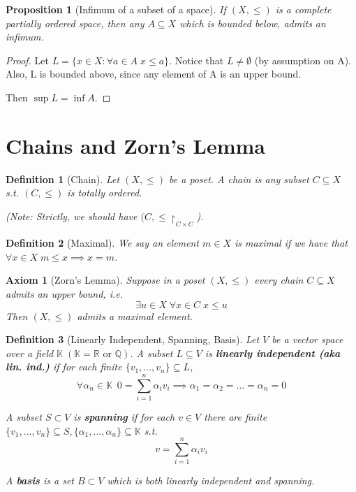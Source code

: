 \documentclass[11pt, oneside]{book}
\theoremstyle{break}
\newtheorem*{proof}{Proof}
\newtheorem{propo}{Proposition}[section]
\newtheorem{defn}{Definition}[section]
\newtheorem{axiom}{Axiom}[section]
\newcommand{\bb}[1]{\mathbb{#1}}			%
\begin{document}
\begin{propo}[Infimum of a subset of a space]
	If $(X, \leq)$ is a complete partially ordered space, then any $A \subseteq X$ which is bounded below, admits an infimum.
\end{propo}

\begin{proof}
	Let $L = \{x \in X : \forall a \in A \; x \leq a \}$. Notice that $L \neq \emptyset$ (by assumption on A). Also, L is bounded above, since any element of A is an upper bound.

	Then $\sup L = \inf A$.
\end{proof}

\section{Chains and Zorn's Lemma}\label{sect:chain_zorn}

\begin{defn}[Chain]
	Let $(X, \leq)$ be a poset. A chain is any subset $C \subseteq X$ s.t. $(C, \leq)$ is totally ordered.

	(Note: Strictly, we should have $(C, \leq \restriction_{C \times C}$).
\end{defn}

\begin{defn}[Maximal]
	We say an element $m \in X$ is maximal if we have that $\forall x \in X \; m \leq x \implies x = m$.	
\end{defn}

\begin{axiom}[Zorn's Lemma]\label{axiom:zorn}
	Suppose in a poset $(X, \leq)$ every chain $C \subseteq X$ admits an upper bound, i.e.
	\begin{equation}
		\exists u \in X \; \forall x \in C \; x \leq u	
	\end{equation}
	Then $(X, \leq)$ admits a maximal element.
\end{axiom}

\begin{defn}[Linearly Independent, Spanning, Basis]
	Let $V$ be a vector space over a field $\bb{K} \; (\bb{K} = \bb{R} \text{ or } \bb{Q})$. A subset $L \subseteq V$ is \textbf{linearly independent (aka lin. ind.)} if for each finite $\{v_1, ..., v_n\} \subseteq L$,
	\begin{equation*}
		\forall \alpha_n \in \bb{K} \enspace 0 = \sum_{i=1}^{n} \alpha_i v_i \implies \alpha_1 = \alpha_2 = \hdots = \alpha_n = 0
	\end{equation*}

	A subset $S \subset V$ is \textbf{spanning} if for each $v \in V$ there are finite $\{v_1, ..., v_n\} \subseteq S, \{\alpha_1, ..., \alpha_n\} \subseteq \bb{K}$ s.t.
	\begin{equation*}
		v = \sum_{i=1}^{n} \alpha_i v_i
	\end{equation*}

	A \textbf{basis} is a set $B \subset V$ which is both linearly independent and spanning.	
\end{defn}
\end{document}
